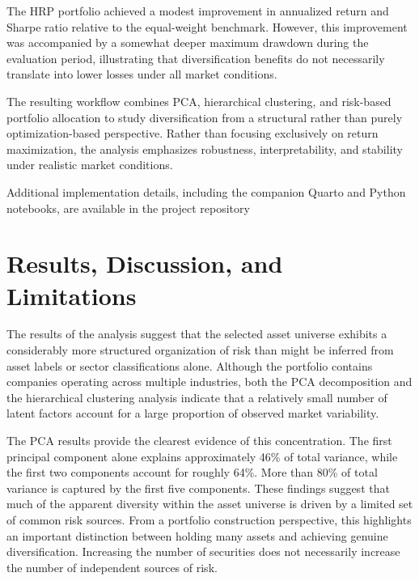\documentclass[
  12pt,
  letterpaper,
]{book}
\begin{document}
The HRP portfolio achieved a modest improvement in annualized return and
Sharpe ratio relative to the equal-weight benchmark. However, this
improvement was accompanied by a somewhat deeper maximum drawdown during
the evaluation period, illustrating that diversification benefits do not
necessarily translate into lower losses under all market conditions.

The resulting workflow combines PCA, hierarchical clustering, and
risk-based portfolio allocation to study diversification from a
structural rather than purely optimization-based perspective. Rather
than focusing exclusively on return maximization, the analysis
emphasizes robustness, interpretability, and stability under realistic
market conditions.

Additional implementation details, including the companion Quarto and
Python notebooks, are available in the project repository
\href{https://github.com/rodrigokang/portfolio/tree/main/notebooks-and-scripts/1-quantitative-finance/2-unsupervised-learning-for-asset-allocation}{\faGithub}

\section{Results, Discussion, and
Limitations}\label{results-discussion-and-limitations-1}

The results of the analysis suggest that the selected asset universe
exhibits a considerably more structured organization of risk than might
be inferred from asset labels or sector classifications alone. Although
the portfolio contains companies operating across multiple industries,
both the PCA decomposition and the hierarchical clustering analysis
indicate that a relatively small number of latent factors account for a
large proportion of observed market variability.

The PCA results provide the clearest evidence of this concentration. The
first principal component alone explains approximately 46\% of total
variance, while the first two components account for roughly 64\%. More
than 80\% of total variance is captured by the first five components.
These findings suggest that much of the apparent diversity within the
asset universe is driven by a limited set of common risk sources. From a
portfolio construction perspective, this highlights an important
distinction between holding many assets and achieving genuine
diversification. Increasing the number of securities does not
necessarily increase the number of independent sources of risk.
\end{document}
